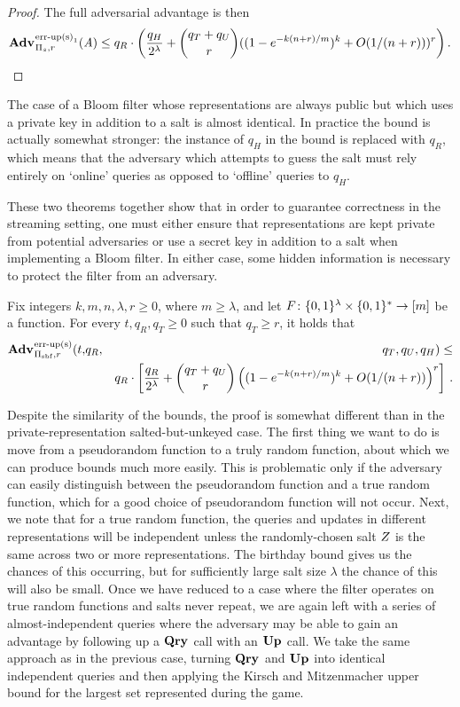 \begin{proof}
The full adversarial advantage is then
$$\Adv{\erreps_1}_{\struct_s,r}(\advA) \le q_R \cdot \left(\frac{q_H}{2^\lambda} + \binom{q_T+q_U}{r}((1-e^{-k(n+r)/m})^k+O(1/(n+r)))^r\right).$$
\missingqed
\end{proof}

The case of a Bloom filter whose representations are always public but which uses a private key in addition to a salt is almost identical. In practice the bound is actually somewhat stronger: the instance of $q_H$ in the bound is replaced with $q_R$, which means that the adversary which attempts to guess the salt must rely entirely on `online' queries as opposed to `offline' queries to $q_H$.

These two theorems together show that in order to guarantee correctness in the streaming setting, one must either ensure that representations are kept private from potential adversaries or use a secret key in addition to a salt when implementing a Bloom filter. In either case, some hidden information is necessary to protect the filter from an adversary.

\begin{theorem}\label{thm:bf-key-bound}
Fix integers $k, m, n, \lambda, r\geq 0$, where $m \geq \lambda$, and let $F \colon \{0,1\}^\lambda \times \{0,1\}^* \to [m]$ be a function.
  For every $t, q_R, q_T \geq 0$ such that $q_T \geq r$, it holds that
  \begin{eqnarray*}
    \Adv{\erreps}_{\struct_\saltybloom,r}(t,&q_R,& q_T, q_U, q_H) \leq \\ && q_R \cdot
     \left[
      \frac{q_R}{2^\lambda} +
      {\dbinom{q_T+q_U}{r}} \left( (1-e^{-k(n+r)/m})^k + O(1/(n+r)) \right)^r
    \right] \,.
\end{eqnarray*}
\end{theorem}

Despite the similarity of the bounds, the proof is somewhat different than in the private-representation salted-but-unkeyed case. The first thing we want to do is move from a pseudorandom function to a truly random function, about which we can produce bounds much more easily. This is problematic only if the adversary can easily distinguish between the pseudorandom function and a true random function, which for a good choice of pseudorandom function will not occur. Next, we note that for a true random function, the queries and updates in different representations will be independent unless the randomly-chosen salt $Z$ is the same across two or more representations. The birthday bound gives us the chances of this occurring, but for sufficiently large salt size $\lambda$ the chance of this will also be small. Once we have reduced to a case where the filter operates on true random functions and salts never repeat, we are again left with a series of almost-independent queries where the adversary may be able to gain an advantage by following up a $\mathbf{Qry}\hspace{0.5pt}$ call with an $\mathbf{Up}\hspace{0.5pt}$ call. We take the same approach as in the previous case, turning $\mathbf{Qry}\hspace{0.5pt}$ and $\mathbf{Up}\hspace{0.5pt}$ into identical independent queries and then applying the Kirsch and Mitzenmacher upper bound for the largest set represented during the game.


